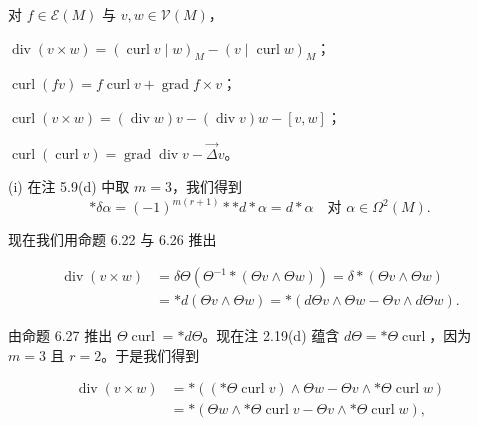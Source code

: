 \begin{proposition}

对 $ f \in \mathcal{E}(M) $ 与 $ v, w \in \mathcal{V}(M) $，

\begin{subitems}
\item

$ \operatorname{div}(v\times w) = (\operatorname{curl} v\mid w)_{M} - (v\mid\operatorname{curl} w)_{M} $；

\item

$ \operatorname{curl}(fv) = f\operatorname{curl} v + \operatorname{grad} f\times v $；

\item

$ \operatorname{curl}(v\times w) = (\operatorname{div} w)v - (\operatorname{div} v)w - [v,w] $；

\item

$ \operatorname{curl}(\operatorname{curl} v) = \operatorname{grad}\operatorname{div} v - \vec{\Delta}v $。

\proofhead
(i) 在注 5.9(d) 中取 $ m = 3 $，我们得到
\[
\ast\delta\alpha = (-1)^{m(r+1)}\ast\ast d\ast\alpha = d\ast\alpha \quad \text{对 } \alpha \in \Omega^{2}(M) .
\]

现在我们用命题 6.22 与 6.26 推出

\begin{equation*}
\begin{aligned}
\operatorname{div}(v\times w) &= \delta\Theta\left(\Theta^{-1}\ast(\Theta v\wedge\Theta w)\right) = \delta\ast(\Theta v\wedge\Theta w) \\ &= \ast d(\Theta v\wedge\Theta w) = \ast(d\Theta v\wedge\Theta w - \Theta v\wedge d\Theta w) .
\end{aligned}
\end{equation*}

由命题 6.27 推出 $ \Theta\operatorname{curl} = \ast d\Theta $。现在注 2.19(d) 蕴含 $ d\Theta = \ast\Theta\operatorname{curl} $，因为 $ m = 3 $ 且 $ r = 2 $。于是我们得到

\begin{equation*}
\begin{aligned}
\operatorname{div}(v\times w) &= \ast\left((\ast\Theta\operatorname{curl} v)\wedge\Theta w - \Theta v\wedge\ast\Theta\operatorname{curl} w\right) \\ &= \ast(\Theta w\wedge\ast\Theta\operatorname{curl} v - \Theta v\wedge\ast\Theta\operatorname{curl} w),
\end{aligned}
\end{equation*}


\end{subitems}
\end{proposition}
